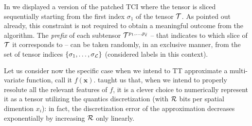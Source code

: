 In  we displayed a version of the patched TCI where the tensor is sliced sequentially starting from the first index $\sigma_1$ of the tensor $\mathcal{T}$. As pointed out already, this constraint is not required to obtain a meaningful outcome from the algorithm.
The \textit{prefix} of each subtensor $\mathcal{T}^{p_1,\dots,p_{\bar \ell}}$ -- that indicates to which slice of $\mathcal{T}$ it corresponds to -- can be taken randomly, in an exclusive manner, from the set of tensor indices $\{\sigma_1,\dots,\sigma_{\mathcal{L}}\}$ (considered labels in this context).

Let us consider now the specific case when we intend to TT approximate a multi-variate function, call it $f(\boldsymbol{x})$.  taught us that, when we intend to properly resolute all the relevant features of $f$, it is a clever choice to numerically represent it as a tensor utilizing the quantics discretization (with $\mathcal{R}$ bits per spatial dimention $x_i$): in fact, the discretization error of the approximation decreases exponentially by increasing $\mathcal{R}$ only linearly. 

